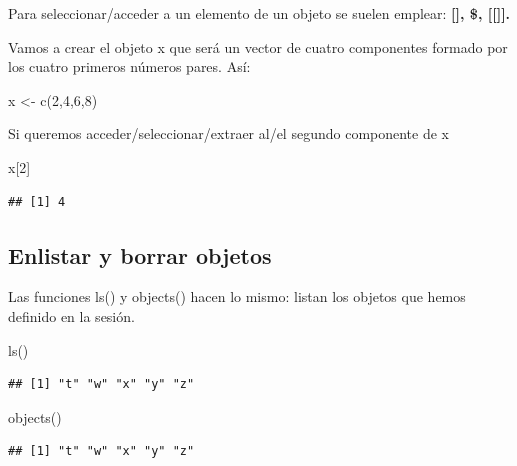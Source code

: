 \documentclass[
]{book}
\newenvironment{Shaded}{\begin{snugshade}}{\end{snugshade}}
\newcommand{\DecValTok}[1]{\textcolor[rgb]{0.00,0.00,0.81}{#1}}
\newcommand{\FunctionTok}[1]{\textcolor[rgb]{0.00,0.00,0.00}{#1}}
\newcommand{\NormalTok}[1]{#1}
\newcommand{\OtherTok}[1]{\textcolor[rgb]{0.56,0.35,0.01}{#1}}
\begin{document}
Para seleccionar/acceder a un elemento de un objeto se suelen emplear: \textbf{{[}{]}, \$, {[}{[}{]}{]}.}

Vamos a crear el objeto x que será un vector de cuatro componentes formado por los cuatro primeros números pares. Así:

\begin{Shaded}
\begin{Highlighting}[]
\NormalTok{x }\OtherTok{\textless{}{-}} \FunctionTok{c}\NormalTok{(}\DecValTok{2}\NormalTok{,}\DecValTok{4}\NormalTok{,}\DecValTok{6}\NormalTok{,}\DecValTok{8}\NormalTok{)}
\end{Highlighting}
\end{Shaded}

Si queremos acceder/seleccionar/extraer al/el segundo componente de x

\begin{Shaded}
\begin{Highlighting}[]
\NormalTok{x[}\DecValTok{2}\NormalTok{]}
\end{Highlighting}
\end{Shaded}

\begin{verbatim}
## [1] 4
\end{verbatim}

\hypertarget{enlistar-y-borrar-objetos}{%
\subsection{Enlistar y borrar objetos}\label{enlistar-y-borrar-objetos}}

Las funciones ls() y objects() hacen lo mismo: listan los objetos que hemos definido en la sesión.

\begin{Shaded}
\begin{Highlighting}[]
\FunctionTok{ls}\NormalTok{()}
\end{Highlighting}
\end{Shaded}

\begin{verbatim}
## [1] "t" "w" "x" "y" "z"
\end{verbatim}

\begin{Shaded}
\begin{Highlighting}[]
\FunctionTok{objects}\NormalTok{()}
\end{Highlighting}
\end{Shaded}

\begin{verbatim}
## [1] "t" "w" "x" "y" "z"
\end{verbatim}
\end{document}
